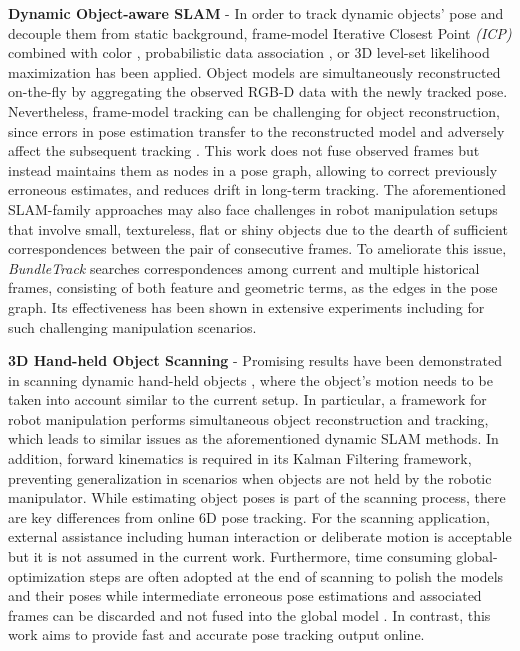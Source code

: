 \documentclass[letterpaper, 10 pt, conference]{ieeeconf}
\begin{document}
\textbf{Dynamic Object-aware SLAM} - In order to track dynamic objects' pose and decouple them from static background, frame-model Iterative Closest Point \textit{(ICP)} combined with color \cite{xu2019mid,runz2018maskfusion,ma2015simultaneous,runz2017co}, probabilistic data association \cite{strecke2019fusion}, or 3D level-set likelihood maximization \cite{yuheng2013star3d} has been applied. Object models are simultaneously reconstructed on-the-fly by aggregating the observed RGB-D data with the newly tracked pose. Nevertheless, frame-model tracking can be challenging for object reconstruction, since errors in pose estimation transfer to the reconstructed model and adversely affect the subsequent tracking \cite{slavcheva2016sdf}. This work does not fuse observed frames but instead maintains them as nodes in a pose graph, allowing to correct previously erroneous estimates, and reduces drift in long-term tracking. The aforementioned SLAM-family approaches may also face challenges in robot manipulation setups that involve small, textureless, flat or shiny objects due to the dearth of sufficient correspondences between the pair of consecutive frames. To ameliorate this issue, \textit{BundleTrack} searches correspondences among current and multiple historical frames, consisting of both feature and geometric terms, as the edges in the pose graph. Its effectiveness has been shown in extensive experiments including for such challenging manipulation scenarios.

\textbf{3D Hand-held Object Scanning} - Promising results have been demonstrated in scanning dynamic hand-held objects \cite{tzionas20153d,weise2011online,krainin2010manipulator,wang2019hand,weise2008accurate}, where the object's motion needs to be taken into account similar to the current setup. In particular, a framework for robot manipulation \cite{krainin2010manipulator} performs simultaneous object reconstruction and tracking, which leads to similar issues as the aforementioned dynamic SLAM methods. In addition, forward kinematics is required in its Kalman Filtering framework, preventing generalization in scenarios when objects are not held by the robotic manipulator. While estimating object poses is part of the scanning process, there are key differences from online 6D pose tracking. For the scanning application, external assistance including human interaction or deliberate motion is acceptable \cite{weise2011online,wang2019hand,weise2008accurate} but it is not assumed in the current work. Furthermore, time consuming global-optimization steps are often adopted at the end of scanning to polish the models and their poses while intermediate erroneous pose estimations and associated frames can be discarded and not fused into the global model \cite{weise2011online,wang2019hand,weise2008accurate}. In contrast, this work aims to provide fast and accurate pose tracking output online.
\end{document}
